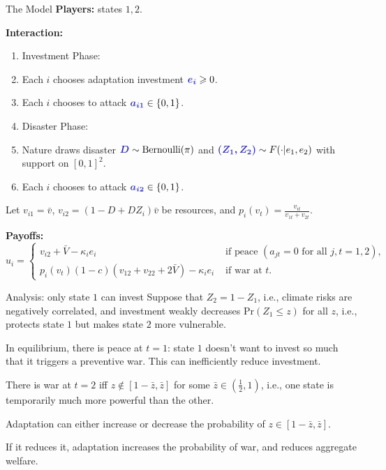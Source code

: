 \documentclass[ignorenonframetext,c,12pt]{beamer}
\providecommand{\tightlist}{%
  \setlength{\itemsep}{0pt}\setlength{\parskip}{0pt}}
\newcommand{\blue}[1]{{\color{blendedblue}#1}}
\newcommand{\myemph}[1]{\bf{\blue{#1}}}
\def\ms{\medskip}
\def\Pr{\text{Pr}}
\renewcommand{\bf}[1]{{\boldsymbol{#1}}}
\let\leq=\leqslant %
\let\geq=\geqslant %
\begin{document}
\begin{frame}{The Model}\vspace{0.5em}
  \textbf{Players:} states $1, 2$.

  \textbf{Interaction:}\vspace{-0.25em}
  \begin{enumerate}\tightlist
    \item[] Investment Phase:
    \item Each $i$ chooses adaptation investment $\myemph{e_i} \geq 0$.
    \item Each $i$ chooses to attack $\myemph{a_{i1}} \in \{0, 1\}$.\ms
    \item[] Disaster Phase:
    \item Nature draws disaster $\myemph{D} \sim \text{Bernoulli}(\pi)$ and $\myemph{(Z_1, Z_2)} \sim F(\cdot|e_1, e_2)$ with support on $[0, 1]^2$.
    \item Each $i$ chooses to attack $\myemph{a_{i2}} \in \{0, 1\}$.
  \end{enumerate}

  Let $v_{i1} = \bar v$, $v_{i2} = (1 - D + D Z_i) \bar v$ be resources, and $p_i(v_t) = \frac{v_{it}}{v_{1t} + v_{2t}}$.

  \textbf{Payoffs:}
  $$u_i = \begin{cases}
    v_{i2} + \bar V - \kappa_i e_i & \text{ if peace } (a_{jt} = 0 \text{ for all } j,t = 1, 2), \\
    p_i(v_t) (1 - c) (v_{12} + v_{22} + 2 \bar V) - \kappa_i e_i & \text{ if war at $t$.}
  \end{cases}$$
\end{frame}

\begin{frame}{Analysis: only state $1$ can invest}
  Suppose that $Z_2 = 1 - Z_1$, i.e., climate risks are negatively correlated, and investment weakly decreases $\Pr(Z_1 \leq z)$ for all $z$, i.e., protects state $1$ but makes state $2$ more vulnerable.

  In equilibrium, there is peace at $t=1$: state $1$ doesn't want to invest so much that it triggers a preventive war. This can inefficiently reduce investment.

  There is war at $t=2$ iff $z \not\in [1-\bar z, \bar z]$ for some $\bar z \in (\frac12, 1)$, i.e., one state is temporarily much more powerful than the other.

  Adaptation can either increase or decrease the probability of $z \in [1-\bar z, \bar z]$.

  If it reduces it, adaptation increases the probability of war, and reduces aggregate welfare.
\end{frame}
\end{document}
